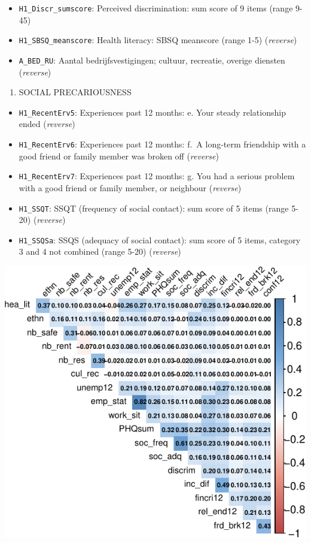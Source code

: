 \documentclass[
]{article}
\providecommand{\tightlist}{%
  \setlength{\itemsep}{0pt}\setlength{\parskip}{0pt}}\usepackage{longtable,booktabs,array}
\begin{document}
\begin{itemize}
\tightlist
\item
  \texttt{H1\_Discr\_sumscore}: Perceived discrimination: sum score of 9
  items (range 9-45)
\item
  \texttt{H1\_SBSQ\_meanscore}: Health literacy: SBSQ meanscore (range
  1-5) (\emph{reverse})
\item
  \texttt{A\_BED\_RU}: Aantal bedrijfsvestigingen; cultuur, recreatie,
  overige diensten (\emph{reverse})
\end{itemize}

\begin{enumerate}
\def\labelenumi{\arabic{enumi}.}
\setcounter{enumi}{4}
\tightlist
\item
  SOCIAL PRECARIOUSNESS
\end{enumerate}

\begin{itemize}
\tightlist
\item
  \texttt{H1\_RecentErv5}: Experiences past 12 months: e. Your steady
  relationship ended (\emph{reverse})
\item
  \texttt{H1\_RecentErv6}: Experiences past 12 months: f.~A long-term
  friendship with a good friend or family member was broken off
  (\emph{reverse})
\item
  \texttt{H1\_RecentErv7}: Experiences past 12 months: g. You had a
  serious problem with a good friend or family member, or neighbour
  (\emph{reverse})
\item
  \texttt{H1\_SSQT}: SSQT (frequency of social contact): sum score of 5
  items (range 5-20) (\emph{reverse})
\item
  \texttt{H1\_SSQSa}: SSQS (adequacy of social contact): sum score of 5
  items, category 3 and 4 not combined (range 5-20) (\emph{reverse})
\end{itemize}

\begin{center}
\includegraphics{draft_v1_files/figure-pdf/unnamed-chunk-12-1.pdf}
\end{center}
\end{document}
